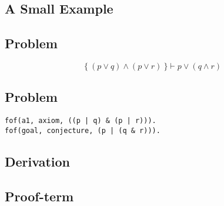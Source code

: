 \documentclass[../main.tex]{subfiles}
\begin{document}
\begin{subappendices}
\section{A Small Example}
\label{appendix}

\subsection{\CPL Problem}

\begin{equation*}
\{\ (p ∨ q) ∧ (p ∨ r)\ \} \vdash p ∨ (q ∧ r)
\end{equation*}

\subsection{\TPTP Problem}

\begin{verbatim}
fof(a1, axiom, ((p | q) & (p | r))).
fof(goal, conjecture, (p | (q & r))).
\end{verbatim}

\subsection{\Metis \TSTP Derivation}


\subsection{\Agda Proof-term}

\end{subappendices}
\end{document}
